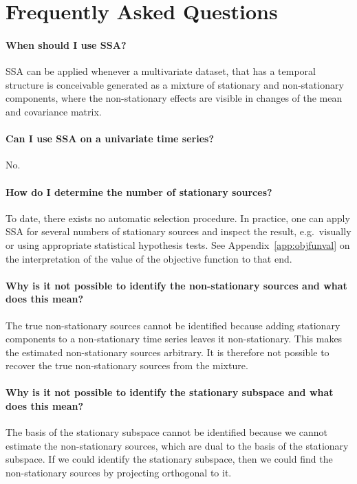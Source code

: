 \documentclass{article}
\newcommand{\1}{\ensuremath{\mathds{1}}}
\newcommand{\0}{\ensuremath{0}}
\begin{document}
\section{Frequently Asked Questions}
\label{sec:faq}

\paragraph{When should I use SSA?} 
SSA can be applied whenever a multivariate dataset, that has a temporal structure is conceivable 
generated as a mixture of stationary and non-stationary components, where the non-stationary 
effects are visible in changes of the mean and covariance matrix. 

\paragraph{Can I use SSA on a univariate time series?} No. 

\paragraph{How do I determine the number of stationary sources?} To date, there exists no automatic
selection procedure. In practice, one can apply SSA for several numbers of stationary sources and inspect
the result, e.g.~visually or using appropriate statistical hypothesis tests. See 
Appendix~\ref{app:objfunval} on the interpretation of the value of the objective function to that end. 

\paragraph{Why is it not possible to identify the non-stationary sources and what does this mean?} 
The true non-stationary sources cannot be identified because adding stationary components to a 
non-stationary time series leaves it non-stationary. This makes the estimated non-stationary sources 
arbitrary. It is therefore not possible to recover the true non-stationary sources from the mixture. 
	
\paragraph{Why is it not possible to identify the stationary subspace and what does this mean?} The basis
of the stationary subspace cannot be identified because we cannot estimate the non-stationary sources, which
are dual to the basis of the stationary subspace. If we could identify the stationary subspace, then we could
find the non-stationary sources by projecting orthogonal to it.
\end{document}

